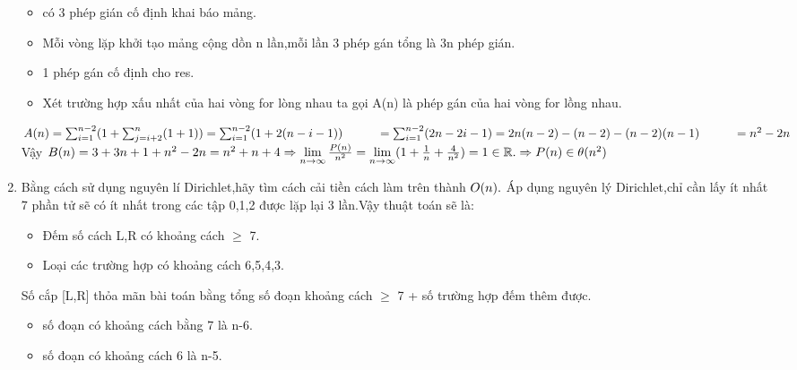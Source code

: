 \documentclass[12pt,a4paper]{article}
\begin{document}
\begin{enumerate}[label=\textbf{Câu 3.\arabic*},leftmargin=*]
\begin{itemize}[label=$\bullet$]
            \item có 3 phép gián cố định khai báo mảng.
            \item Mỗi vòng lặp khởi tạo mảng cộng dồn n lần,mỗi lần 3 phép gán tổng là 3n phép gián.
            \item 1 phép gán cố định cho res.
            \item Xét trường hợp xấu nhất của hai vòng for lòng nhau ta gọi A(n) là phép gán của hai vòng for lồng nhau.
        \end{itemize}
        $A(n)=\sum_{i = 1}^{n-2}(1+\sum_{j = i+2}^{n}(1+1))=\sum_{i = 1}^{n-2}(1+2(n-i-1))  \\ \\ 
        \hspace*{1cm}=\sum_{i = 1}^{n-2}(2n-2i-1)=2n(n-2)-(n-2)-(n-2)(n-1)\\ \\
        \hspace*{1cm}=n^2-2n\\ \\$
        Vậy $B(n)=3+3n+1+n^2-2n=n^2+n+4\Rightarrow \lim\limits_{n \to \infty}\frac{P(n)}{n^2}=\lim\limits_{n \to \infty}(1+\frac{1}{n}+\frac{4}{n^2})=1 \in \mathbb{R}.\\ \\
        \Rightarrow P(n)\in \theta(n^2)$
        \item Bằng cách sử dụng nguyên lí Dirichlet,hãy tìm cách cải tiền cách làm trên thành $O(n).\\ \\ $
        \hspace*{1.1cm} Áp dụng nguyên lý Dirichlet,chỉ cần lấy ít nhất 7 phần tử sẽ có ít nhất trong các tập {0,1,2} được lặp lại 3 lần.Vậy thuật toán sẽ là:
        \begin{itemize}[label=$\bullet$]
            \item Đếm số cách L,R có khoảng cách $\geq$ 7.
            \item Loại các trường hợp có khoảng cách 6,5,4,3.
        \end{itemize}
        Số cắp [L,R] thỏa mãn bài toán bằng tổng số đoạn khoảng cách $\geq$ 7 + số trường hợp đếm thêm được.
        \begin{itemize}[label=$\bullet$]
            \item số đoạn có khoảng cách bằng 7 là n-6.
            \item số đoạn có khoảng cách 6 là n-5.
        \end{itemize}
        \begin{center}

\end{center}
\end{enumerate}
\end{document}
